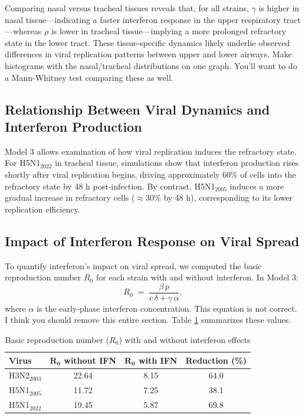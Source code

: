 \documentclass[12pt]{article}
\begin{document}
Comparing nasal versus tracheal tissues reveals that, for all strains, \(\gamma\) is higher in nasal tissue—indicating a faster interferon response in the upper respiratory tract—whereas \(\rho\) is lower in tracheal tissue—implying a more prolonged refractory state in the lower tract. These tissue‐specific dynamics likely underlie observed differences in viral replication patterns between upper and lower airways. \color{red} Make histograms with the nasal/tracheal distributions on one graph. You'll want to do a Mann-Whitney test comparing these as well.\color{black}

\subsection{Relationship Between Viral Dynamics and Interferon Production}

Model 3 allows examination of how viral replication induces the refractory state. For H5N1\(_{2022}\) in tracheal tissue, simulations show that interferon production rises shortly after viral replication begins, driving approximately 60\% of cells into the refractory state by 48 h post‐infection. By contrast, H5N1\(_{2005}\) induces a more gradual increase in refractory cells (\(\approx 30\%\) by 48 h), corresponding to its lower replication efficiency.

\subsection{Impact of Interferon Response on Viral Spread}

To quantify interferon's impact on viral spread, we computed the basic reproduction number \(R_{0}\) for each strain with and without interferon. In Model 3:
\[
R_{0} \;=\; \frac{\beta\,p}{c\,\delta + \gamma\,\alpha},
\]
where \(\alpha\) is the early‐phase interferon concentration. \color{red} This equation is not correct. I think you should remove this entire section. \color{black} Table \ref{tab:R0_comparison} summarizes these values.

\begin{table}[ht]
\centering
\caption{Basic reproduction number (\(R_{0}\)) with and without interferon effects}
\begin{tabular}{@{}lccc@{}}
\toprule
\textbf{Virus}               & \(\mathbf{R_{0}}\) \textbf{without IFN} & \(\mathbf{R_{0}}\) \textbf{with IFN} & \textbf{Reduction (\%)} \\ 
\midrule
H3N2$_{2003}$  & 22.64 &  8.15 & 64.0 \\
H5N1$_{2005}$  & 11.72 &  7.25 & 38.1 \\
H5N1$_{2022}$  & 19.45 &  5.87 & 69.8 \\
\bottomrule
\end{tabular}
\label{tab:R0_comparison}
\end{table}
\end{document}
